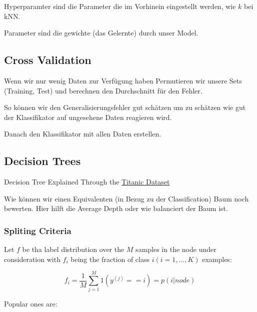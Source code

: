 \documentclass[a4paper]{article}
\begin{document}
Hyperparamter sind die Parameter die im Vorhinein eingestellt werden, wie $k$ bei kNN.

Parameter sind die gewichte (das Gelernte) durch unser Model.

\subsection{Cross Validation}

Wenn wir nur wenig Daten zur Verfügung haben Permutieren wir unsere Sets (Training, Test) und berechnen den Durchschnitt für den Fehler.

So können wir den Generalisierungsfehler gut schätzen um zu schätzen wie gut der Klassifikator auf ungesehene Daten reagieren wird.

Danach den Klassifikator mit allen Daten erstellen.

\subsection{Decision Trees}

Decision Tree Explained Through the \href{https://erickhangati.com/decision-tree-explained-through-titanic-dataset/}{Titanic Dataset}

Wie können wir einen Equivalenten (in Bezug zu der Classification) Baum noch bewerten. Hier hilft die Average Depth oder wie balanciert der Baum ist.

\subsubsection{Spliting Criteria}

Let $f$ be tha label distribution over the $M$ samples in the node under consideration with $f_i$ being the fraction of class $i(i=1,..., K)$ examples:

\[
f_i = \frac{1}{M}\sum_{j=1}^{M} 1(y^{(j)}==i) = p(i | node)
\]

Popular ones are:
\end{document}
